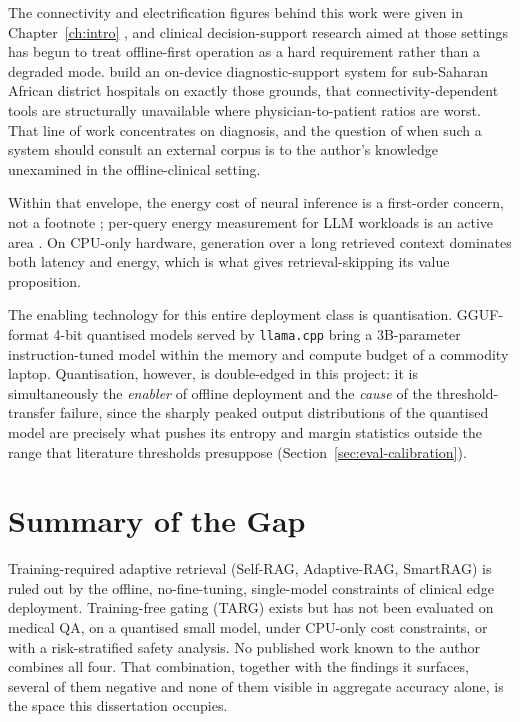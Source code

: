 The connectivity and electrification figures behind this work were given in
Chapter~\ref{ch:intro} \citep{itu2025factsfigures, sdg7tracking2025}, and
clinical decision-support research aimed at those settings has begun to treat
offline-first operation as a hard requirement rather than a degraded mode.
\citet{walusimbi2026aletheia} build an on-device diagnostic-support system for
sub-Saharan African district hospitals on exactly those grounds, that
connectivity-dependent tools are structurally unavailable where
physician-to-patient ratios are worst. That line of work concentrates on
diagnosis, and the question of when such a system should consult an external
corpus is to the author's knowledge unexamined in the offline-clinical
setting.

Within that envelope, the energy cost of neural inference is a first-order
concern, not a footnote \citep{strubell2019}; per-query energy measurement
for LLM workloads is an active area \citep{wilkins2024}. On CPU-only
hardware, generation over a long retrieved context dominates both latency
and energy, which is what gives retrieval-skipping its value proposition.

The enabling technology for this entire deployment class is quantisation.
GGUF-format 4-bit quantised models served by \texttt{llama.cpp}
\citep{llamacpp} bring a 3B-parameter instruction-tuned model
\citep{llama3} within the memory and compute budget of a commodity laptop.
Quantisation, however, is double-edged in this project: it is
simultaneously the \emph{enabler} of offline deployment and the \emph{cause}
of the threshold-transfer failure, since the sharply peaked output distributions
of the quantised model are precisely what pushes its entropy and margin
statistics outside the range that literature thresholds presuppose
(Section~\ref{sec:eval-calibration}).

\section{Summary of the Gap}
\label{sec:bg-gap}

Training-required adaptive retrieval (Self-RAG, Adaptive-RAG, SmartRAG) is
ruled out by the offline, no-fine-tuning, single-model constraints of
clinical edge deployment. Training-free gating (TARG) exists but has not been
evaluated on medical QA, on a quantised small model, under CPU-only cost
constraints, or with a risk-stratified safety analysis. No published work
known to the author combines all four. That combination, together with the
findings it surfaces, several of them negative and none of them visible in
aggregate accuracy alone, is the space this dissertation occupies.